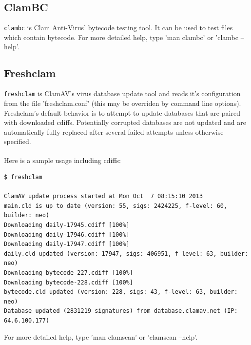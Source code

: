 \documentclass[a4paper,titlepage,12pt]{article}
\begin{document}
    \subsection{ClamBC}
    \verb+clambc+ is Clam Anti-Virus' bytecode testing tool.  It can be
    used to test files which contain bytecode. For more detailed help,
    type 'man clambc' or 'clambc --help'.

    \subsection{Freshclam}\label{sec:freshclam}
    \verb+freshclam+ is ClamAV's virus database update tool and reads it's
    configuration from the file 'freshclam.conf' (this may be
    overriden by command line options). Freshclam's default behavior is to
    attempt to update databases that are paired with downloaded cdiffs.
    Potentially corrupted databases are not updated and are automatically
    fully replaced after several failed attempts unless otherwise specified.
    \\\\
    Here is a sample usage including cdiffs:
{\footnotesize
    \begin{verbatim}
$ freshclam

ClamAV update process started at Mon Oct  7 08:15:10 2013
main.cld is up to date (version: 55, sigs: 2424225, f-level: 60, builder: neo)
Downloading daily-17945.cdiff [100%]
Downloading daily-17946.cdiff [100%]
Downloading daily-17947.cdiff [100%]
daily.cld updated (version: 17947, sigs: 406951, f-level: 63, builder: neo)
Downloading bytecode-227.cdiff [100%]
Downloading bytecode-228.cdiff [100%]
bytecode.cld updated (version: 228, sigs: 43, f-level: 63, builder: neo)
Database updated (2831219 signatures) from database.clamav.net (IP: 64.6.100.177)
    \end{verbatim}
}
    For more detailed help, type 'man clamscan' or 'clamscan --help'.
\end{document}
